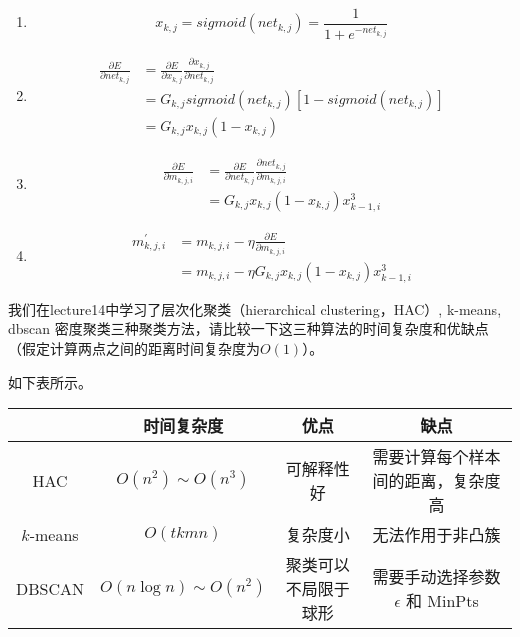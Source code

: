 \begin{solution}
    \begin{enumerate}
        \item \begin{equation*}
            x_{k,j} = sigmoid(net_{k,j}) = \frac{1}{1+e^{-net_{k,j}}}
        \end{equation*}
        \item \begin{align*}
            \frac{\partial E}{\partial net_{k,j}} &= \frac{\partial E}{\partial x_{k,j}}\frac{\partial x_{k,j}}{\partial net_{k,j}} \\
            &= G_{k,j}sigmoid(net_{k,j})[1-sigmoid(net_{k,j})] \\
            &= G_{k,j}x_{k,j}(1-x_{k,j})
        \end{align*}
        \item \begin{align*}
            \frac{\partial E}{\partial m_{k,j,i}} &= \frac{\partial E}{\partial net_{k,j}}\frac{\partial net_{k,j}}{\partial m_{k,j,i}}\\
            &= G_{k,j}x_{k,j}(1-x_{k,j})x_{k-1,i}^3
        \end{align*}
        \item \begin{align*}
            m_{k,j,i}^\prime &= m_{k,j,i} - \eta \frac{\partial E}{\partial m_{k,j,i}}\\
            &= m_{k,j,i} - \eta G_{k,j}x_{k,j}(1-x_{k,j})x_{k-1,i}^3
        \end{align*}
    \end{enumerate}
\end{solution}

\begin{problem}
    我们在lecture14中学习了层次化聚类（hierarchical clustering，HAC）, k-means,  dbscan 密度聚类三种聚类方法，请比较一下这三种算法的时间复杂度和优缺点（假定计算两点之间的距离时间复杂度为$O(1)$）。
\end{problem}

\begin{solution}
    如下表所示。

    \begin{tabular}{cccc}
        \toprule
            & \bfseries 时间复杂度  & \bfseries 优点 & \bfseries 缺点 \\
        \midrule
        HAC &  $O(n^2)\sim O(n^3)$  & 可解释性好  & 需要计算每个样本间的距离，复杂度高   \\
        $k$-means & $O(tkmn)$ & 复杂度小  &  无法作用于非凸簇   \\
        DBSCAN &  $O(n\log n) \sim O(n^2)$  & 聚类可以不局限于球形 & 需要手动选择参数 $\epsilon$ 和 MinPts  \\
        \bottomrule
    \end{tabular}
\end{solution}

